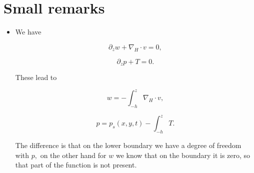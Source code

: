 \documentclass[11pt]{article}
\begin{document}
\section{Small remarks}  

\begin{itemize}

  \item We have
  
    $$\partial_z w + \nabla_H \cdot v = 0,$$
    
    $$ \partial_z p + T = 0.$$
  
  These lead to
  
    $$ w = - \int_{-h}^z \nabla_H \cdot v, $$
    
    $$ p = p_s(x,y,t) - \int_{-h}^z T .$$

The difference is that on the lower boundary we have a degree of freedom with $p,$ on the other hand for $w$ we know that on the boundary it is zero, so that part of the function is not present.

\end{itemize}
\end{document}
